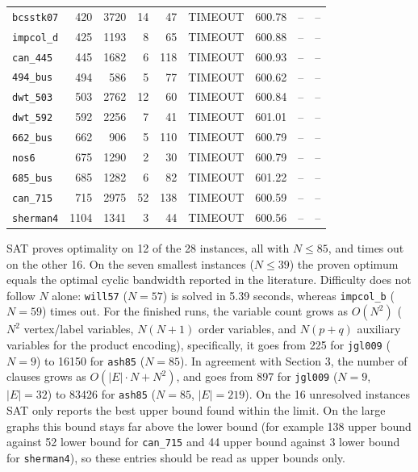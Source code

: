 \documentclass[a4paper,fleqn]{cas-sc}
\begin{document}
\begin{center}
\begin{tabular}{lrrrrlrrr}
        \texttt{bcsstk07} & 420 & 3720 & 14 & 47 & TIMEOUT & 600.78 & -- & -- \\
        \texttt{impcol\_d} & 425 & 1193 & 8 & 65 & TIMEOUT & 600.88 & -- & -- \\
        \texttt{can\_445} & 445 & 1682 & 6 & 118 & TIMEOUT & 600.93 & -- & -- \\
        \texttt{494\_bus} & 494 & 586 & 5 & 77 & TIMEOUT & 600.62 & -- & -- \\
        \texttt{dwt\_503} & 503 & 2762 & 12 & 60 & TIMEOUT & 600.84 & -- & -- \\
        \texttt{dwt\_592} & 592 & 2256 & 7 & 41 & TIMEOUT & 601.01 & -- & -- \\
        \texttt{662\_bus} & 662 & 906 & 5 & 110 & TIMEOUT & 600.79 & -- & -- \\
        \texttt{nos6} & 675 & 1290 & 2 & 30 & TIMEOUT & 600.79 & -- & -- \\
        \texttt{685\_bus} & 685 & 1282 & 6 & 82 & TIMEOUT & 601.22 & -- & -- \\
        \texttt{can\_715} & 715 & 2975 & 52 & 138 & TIMEOUT & 600.59 & -- & -- \\
        \texttt{sherman4} & 1104 & 1341 & 3 & 44 & TIMEOUT & 600.56 & -- & -- \\
        \bottomrule
        \end{tabular}
        \end{center}

        SAT proves optimality on 12 of the 28 instances, all with $N \le 85$, and times out on the other 16. On the seven smallest instances ($N \le 39$) the proven optimum equals the optimal cyclic bandwidth reported in the literature. Difficulty does not follow $N$ alone: \texttt{will57} ($N=57$) is solved in 5.39 seconds, whereas \texttt{impcol\_b} ($N=59$) times out. For the finished runs, the variable count grows as $O(N^2)$ ($N^2$ vertex/label variables, $N(N+1)$ order variables, and $N(p+q)$ auxiliary variables for the product encoding), specifically, it goes from 225 for \texttt{jgl009} ($N=9$) to 16150 for \texttt{ash85} ($N=85$). In agreement with Section 3, the number of clauses grows as $O(|E| \cdot N + N^2)$, and goes from 897 for \texttt{jgl009} ($N=9$, $|E|=32$) to 83426 for \texttt{ash85} ($N=85$, $|E|=219$).
        On the 16 unresolved instances SAT only reports the best upper bound found within the limit. On the large graphs this bound stays far above the lower bound (for example 138 upper bound against 52 lower bound for \texttt{can\_715} and 44 upper bound against 3 lower bound for \texttt{sherman4}), so these entries should be read as upper bounds only.
\end{document}
